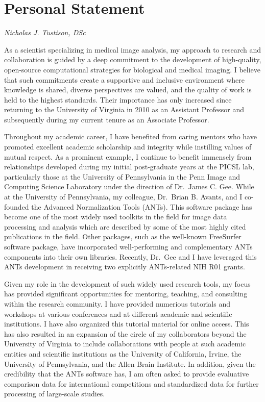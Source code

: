 \documentclass[
  11pt,
]{article}
\author{}
\date{\vspace{-2.5em}}
\begin{document}

\hypertarget{personal-statement}{%
\section{Personal Statement}\label{personal-statement}}

\emph{Nicholas J. Tustison, DSc}

As a scientist specializing in medical image analysis, my approach to
research and collaboration is guided by a deep commitment to the
development of high-quality, open-source computational strategies for
biological and medical imaging. I believe that such commitments create a
supportive and inclusive environment where knowledge is shared, diverse
perspectives are valued, and the quality of work is held to the highest
standards. Their importance has only increased since returning to the
University of Virginia in 2010 as an Assistant Professor and
subsequently during my current tenure as an Associate Professor.

Throughout my academic career, I have benefited from caring mentors who
have promoted excellent academic scholarship and integrity while
instilling values of mutual respect. As a prominent example, I continue
to benefit immensely from relationships developed during my initial
post-graduate years at the PICSL lab, particularly those at the
University of Pennsylvania in the Penn Image and Computing Science
Laboratory under the direction of Dr.~James C. Gee. While at the
University of Pennsylvania, my colleague, Dr.~Brian B. Avants, and I
co-founded the Advanced Normalization Tools (ANTs). This software
package has become one of the most widely used toolkits in the field for
image data processing and analysis which are described by some of the
most highly cited publications in the field. Other packages, such as the
well-known FreeSurfer software package, have incorporated
well-performing and complementary ANTs components into their own
libraries. Recently, Dr.~Gee and I have leveraged this ANTs development
in receiving two explicitly ANTs-related NIH R01 grants.

Given my role in the development of such widely used research tools, my
focus has provided significant opportunities for mentoring, teaching,
and consulting within the research community. I have provided numerious
tutorials and workshops at various conferences and at different academic
and scientific institutions. I have also organized this tutorial
material for online access. This has also resulted in an expansion of
the circle of my collaborators beyond the University of Virginia to
include collaborations with people at such academic entities and
scientific institutions as the University of California, Irvine, the
University of Pennsylvania, and the Allen Brain Institute. In addition,
given the credibility that the ANTs software has, I am often asked to
provide evaluative comparison data for international competitions and
standardized data for further processing of large-scale studies.
\end{document}
